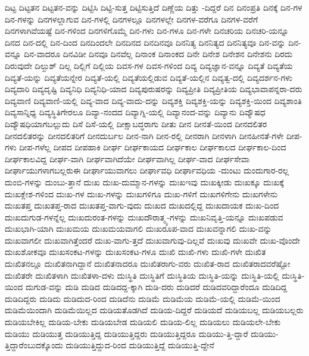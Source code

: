 {ದಿಟ್ಟ
ದಿಟ್ಟತನ
ದಿಟ್ಟತನ-ವನ್ನು
ದಿಟ್ಟಿಸಿ
ದಿಟ್ಟಿ-ಸುತ್ತ
ದಿಟ್ಟಿಸುತ್ತಿದೆ
ದಿಣ್ಣೆಯ
ದಿತ್ತು
-ದಿದ್ದರೆ
ದಿನ
ದಿನಂಪ್ರತಿ
ದಿನಕ್ಕೆ
ದಿನ-ಗಳ
ದಿನ-ಗಳನ್ನು
ದಿನಗಳಲ್ಲಾಗುವ
ದಿನ-ಗಳಲ್ಲಿ
ದಿನಗಳಲ್ಲೂ
ದಿನಗಳಲ್ಲೇ
ದಿನಗಳ-ವರೆಗೂ
ದಿನಗಳ-ವರೆಗೆ
ದಿನಗಳಾಗಿವೆಯಷ್ಟೆ
ದಿನ-ಗಳಿಂದ
ದಿನಗಳಿಗೊಮ್ಮೆ
ದಿನ-ಗಳು
ದಿನ-ಗಳೂ
ದಿನ-ಗಳೇ
ದಿನಚರಿಯ
ದಿನಚರಿ-ಯನ್ನೂ
ದಿನದ
ದಿನ-ದಲ್ಲಿ
ದಿನ-ದಿಂದ
ದಿನದಿಂದಲೇ
ದಿನದಿನದ
ದಿನದಿನವೂ
ದಿನನಿತ್ಯ
ದಿನನಿತ್ಯದ
ದಿನನಿತ್ಯವೂ
ದಿನ-ವನ್ನು
ದಿನ-ವನ್ನೂ
ದಿನ-ವಾದರೂ
ದಿನವಿಡೀ
ದಿನವೂ
ದಿನವೆಲ್ಲ
ದಿನಾಂಕ
ದಿನಾಂಕದ
ದಿನೇ
ದಿನೇಶ
ದಿನೇಶನ
ದಿನೇಶನು
ದಿರದು
ದಿರುವುದೇ
ದಿಲ್ಖುಶ್
ದಿಲ್ಲ
ದಿಲ್ಲಿಗೆ
ದಿಲ್ಲಿಯ
ದಿವಸ-ಗಳ
ದಿವಸ-ಗಳಿಂದ
ದಿವ್ಯ
ದಿವ್ಯಜ್ಞಾನ-ವನ್ನೂ
ದಿವ್ಯತೆ
ದಿವ್ಯತೆಯ
ದಿವ್ಯತೆ-ಯನ್ನು
ದಿವ್ಯತೆಯನ್ನೇರ
ದಿವ್ಯತೆ-ಯಲ್ಲಿ
ದಿವ್ಯತೆಯಲ್ಲಿಡುವ
ದಿವ್ಯತೆ-ಯಲ್ಲಿನ
ದಿವ್ಯತ್ವ-ದಲ್ಲಿ
ದಿವ್ಯದರ್ಶನ-ಗಳು
ದಿವ್ಯದಾರಿ
ದಿವ್ಯದೃಷ್ಟಿ
ದಿವ್ಯನಿಧಿ
ದಿವ್ಯನಿಧಿ-ಯಾದ
ದಿವ್ಯಪುರುಷರನ್ನು
ದಿವ್ಯಪ್ರೀತಿ
ದಿವ್ಯಪ್ರೀತಿಯ
ದಿವ್ಯಭಾವಾಪನ್ನರಾ-ದರು
ದಿವ್ಯವಾಣಿ
ದಿವ್ಯವಾಣಿ-ಯಲ್ಲಿ
ದಿವ್ಯ-ವಾದ
ದಿವ್ಯ-ವಾದು-ದನ್ನು
ದಿವ್ಯಶಕ್ತಿ
ದಿವ್ಯಶಕ್ತಿ-ಯನ್ನು
ದಿವ್ಯಶಕ್ತಿ-ಯಿಂದ
ದಿವ್ಯಶಾಂತಿ
ದಿವ್ಯಸಾನ್ನಿಧ್ಯ
ದಿವ್ಯಸ್ಥಿತಿಗೇರಲೂ
ದಿವ್ಯಾ-ನಂದದ
ದಿವ್ಯಾಗ್ನಿ-ಯಲ್ಲಿ
ದಿವ್ಯಾನಂದ-ವನ್ನು
ದಿವ್ಯಾನು
ದಿವ್ಯೌಷಧ
ದಿವ್ಯೌಷಧಿಯಾಗಬಲ್ಲುದು
ದಿಸೆ
ದಿಸೆ-ಯಲ್ಲಿ
ದೀಕ್ಷಾಬದ್ಧರಾಗು
ದೀತು
ದೀನ
ದೀನತೆ-ಯಿಂದ
ದೀನದಲಿತರ
ದೀನದಲಿತರನ್ನು
ದೀನದಲಿತರಿಗೆ
ದೀನದುರ್ಬಲ
ದೀನ-ನಾಗಿ
ದೀನ-ರಲ್ಲಿ
ದೀನರಾಗಿ
ದೀನಳಾಗಿ
ದೀನಹೀನತೆ-ಗಳೇ
ದೀಪ-ಗಳು
ದೀಪ-ಗಳೆಲ್ಲ
ದೀಪದ
ದೀಪಹಾಕಿ
ದೀರ್ಘ
ದೀರ್ಘಕಾಯದ
ದೀರ್ಘಕಾಲ
ದೀರ್ಘಕಾಲದ
ದೀರ್ಘಕಾಲ-ದಿಂದ
ದೀರ್ಘಕಾಲವಿದ್ದ
ದೀರ್ಘ-ವಾಗಿ
ದೀರ್ಘವಾಗಿದೆಯೇ
ದೀರ್ಘವಾಗಿಲ್ಲ
ದೀರ್ಘ-ವಾದ
ದೀರ್ಘಸೇವಾ
ದೀರ್ಘಾಯುಗಳಾಗಬಲ್ಲರುಈ
ದೀರ್ಘಾಯುವಾಗಲು
ದೀರ್ಘಾವಧಿ
ದೀರ್ಘಾವಧಿಯ
-ದುಂಟು
ದುಂದುಗಾರ-ರಲ್ಲ
ದುಂಬಿ-ಗಳನ್ನು
ದುಂಬು-ತ್ತಾನೆ
ದುಃಖ
ದುಃಖ-ದುಮ್ಮಾನ-ಗಳನ್ನು
ದುಃಖಇವು
ದುಃಖಕ್ಕೀಡು
ದುಃಖಕ್ಕೂ
ದುಃಖಕ್ಕೆ
ದುಃಖಕ್ಲೇಶ-ಗಳಿಂದ
ದುಃಖ-ಗಳ
ದುಃಖ-ಗಳನ್ನು
ದುಃಖಗಳಿಗೂ
ದುಃಖ-ಗಳಿಗೆ
ದುಃಖಗಳಿಗೇನು
ದುಃಖಗಳೇನು
ದುಃಖತಪ್ತ
ದುಃಖತಪ್ತ-ರಾದ
ದುಃಖತಪ್ತ-ವಾಗು-ವುದು
ದುಃಖದ
ದುಃಖದಲ್ಲಿದ್ದ
ದುಃಖದಾಯಕ
ದುಃಖ-ದಿಂದ
ದುಃಖದುಗುಡ-ಗಳನ್ನೆಲ್ಲ
ದುಃಖದುರಂತ-ಗಳನ್ನು
ದುಃಖದೌರಾತ್ಮ್ಯ-ಗಳನ್ನು
ದುಃಖನಿವೃತ್ತಿ-ಯನ್ನೂ
ದುಃಖಪಡುವ
ದುಃಖಭಾಗಿ-ಯಾಗಿ
ದುಃಖಮಯ
ದುಃಖಮಯವಾಗಲಿ
ದುಃಖರೂಪ-ವಾದ
ದುಃಖವನ್ನಾಗಲಿ
ದುಃಖ-ವನ್ನು
ದುಃಖವಾಗಲೀ
ದುಃಖವಾಗಿತ್ತೆಂದರೆ
ದುಃಖ-ವಾಗು-ತ್ತದೆ
ದುಃಖವಾಗುವು-ದಿಲ್ಲವೆ
ದುಃಖವು
ದುಃಖವೇ
ದುಃಖ-ವೊಂದೇ
ದುಃಖಶೋಕವೂ
ದುಃಖಸಂಕಟ-ಗಳನ್ನು
ದುಃಖಸಂಕಟ-ಗಳೂ
ದುಃಖಿ
ದುಃಖಿ-ಗಳು
ದುಃಖಿ-ಗಳೇ
ದುಃಖಿತ
ದುಃಖಿತನಲ್ಲೂ
ದುಃಖಿತನಾಗಿದ್ದಾನೆ
ದುಃಖಿತನಾದರೂ
ದುಃಖಿತರಾಗು-ವರು
ದುಃಖಿತ-ರಾದ
ದುಃಖಿತರಾದವರೆಷ್ಟೋ
ದುಃಖಿತರೇ
ದುಃಖಿತಳಾಗಿ
ದುಃಖಿತಳಾ-ದಳು
ದುಃಸ್ಥಿತಿ
ದುಃಸ್ಥಿತಿಗೆ
ದುಃಸ್ಥಿತಿಯ
ದುಃಸ್ಥಿತಿ-ಯನ್ನು
ದುಃಸ್ಥಿತಿ-ಯಲ್ಲಿ
ದುಃಸ್ಥಿತಿ-ಯಿಂದ
ದುಗುಡ-ವನ್ನು
ದುಡಿ
ದುಡಿದ
ದುಡಿದದ್ದ-ಕ್ಕಾಗಿ
ದುಡಿ-ದರು
ದುಡಿದರೆ
ದುಡಿದವರಿದ್ದಾರೆಂದೂ
ದುಡಿದಿದ್ದ
ದುಡಿದಿದ್ದರು
ದುಡಿದು
ದುಡಿದುದ-ರಿಂದ
ದುಡಿದೆನು
ದುಡಿಮೆ
ದುಡಿಮೆಯ
ದುಡಿಮೆ-ಯಲ್ಲಿ
ದುಡಿಮೆ-ಯಿಂದ
ದುಡಿಮೆಯಿಂದಾಗಿ
ದುಡಿಮೆಯಿಲ್ಲದ
ದುಡಿಯತೊಡಗಿದೆ
ದುಡಿಯ-ದಿದ್ದರೆ
ದುಡಿಯದೆ
ದುಡಿಯಬಲ್ಲ
ದುಡಿಯಬಲ್ಲರು
ದುಡಿಯಬೇಕಿಲ್ಲ
ದುಡಿಯ-ಬೇಕು
ದುಡಿಯಬೇಡ
ದುಡಿಯಲಿ
ದುಡಿಯ-ಲಿಲ್ಲ
ದುಡಿಯಲು
ದುಡಿಯಲೇ-ಬೇಕು
ದುಡಿಯು
ದುಡಿಯುತ್ತ
ದುಡಿಯುತ್ತಿದ್ದ
ದುಡಿಯುತ್ತಿದ್ದರು
ದುಡಿಯುತ್ತಿದ್ದರೂ
ದುಡಿಯು-ತ್ತಿ-ದ್ದಾರೆ
ದುಡಿಯು-ತ್ತಿದ್ದಾರೆಂಬುದಕ್ಕೊಂದು
ದುಡಿಯುತ್ತಿದ್ದುದ-ರಿಂದ
ದುಡಿಯುತ್ತಿದ್ದೆ
ದುಡಿಯುತ್ತಿ-ದ್ದೇನೆ
}
